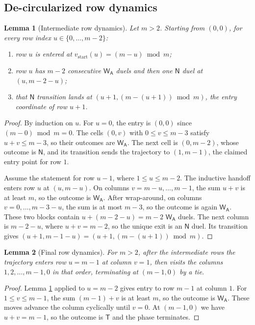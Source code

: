 \documentclass[11pt]{article}
\newtheorem{lemma}{Lemma}
\theoremstyle{definition}
\theoremstyle{remark}
\newcommand{\WA}{\mathsf{W_A}}
\newcommand{\TT}{\mathsf{T}}
\newcommand{\NN}{\mathsf{N}}
\begin{document}
\subsection{De-circularized row dynamics}
\begin{lemma}[Intermediate row dynamics]\label{lem:row-dynamics}
Let $m>2$. Starting from $(0,0)$, for every row index $u\in\{0,\dots,m-2\}$:
\begin{enumerate}[label=(\roman*),nosep]
    \item row $u$ is entered at $v_{\mathrm{start}}(u)=(m-u)\bmod m$;
    \item row $u$ has $m-2$ consecutive $\WA$ duels and then one $\NN$ duel at $(u,m-2-u)$;
    \item that $\NN$ transition lands at $(u+1,(m-(u+1))\bmod m)$, the entry coordinate of row $u+1$.
\end{enumerate}
\end{lemma}
\begin{proof}
By induction on $u$. For $u=0$, the entry is $(0,0)$ since $(m-0)\bmod m=0$. The cells $(0,v)$ with $0\le v\le m-3$ satisfy $u+v\le m-3$, so their outcomes are $\WA$. The next cell is $(0,m-2)$, whose outcome is $\NN$, and its transition sends the trajectory to $(1,m-1)$, the claimed entry point for row $1$.

Assume the statement for row $u-1$, where $1\le u\le m-2$. The inductive handoff enters row $u$ at $(u,m-u)$. On columns $v=m-u,\dots,m-1$, the sum $u+v$ is at least $m$, so the outcome is $\WA$. After wrap-around, on columns $v=0,\dots,m-3-u$, the sum is at most $m-3$, so the outcome is again $\WA$. These two blocks contain $u+(m-2-u)=m-2$ $\WA$ duels. The next column is $m-2-u$, where $u+v=m-2$, so the unique exit is an $\NN$ duel. Its transition gives $(u+1,m-1-u)=(u+1,(m-(u+1))\bmod m)$.
\end{proof}

\begin{lemma}[Final row dynamics]\label{lem:final-row}
For $m>2$, after the intermediate rows the trajectory enters row $u=m-1$ at column $v=1$, then visits the columns $1,2,\dots,m-1,0$ in that order, terminating at $(m-1,0)$ by a tie.
\end{lemma}
\begin{proof}
Lemma \ref{lem:row-dynamics} applied to $u=m-2$ gives entry to row $m-1$ at column $1$. For $1\le v\le m-1$, the sum $(m-1)+v$ is at least $m$, so the outcome is $\WA$. These moves advance the column cyclically until $v=0$. At $(m-1,0)$ we have $u+v=m-1$, so the outcome is $\TT$ and the phase terminates.
\end{proof}
\end{document}
